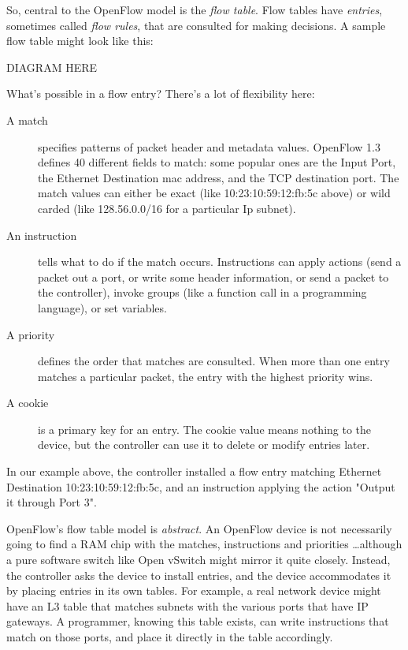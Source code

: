 So, central to the OpenFlow model is the \textit{flow table}.  
Flow tables have \textit{entries}, sometimes called \textit{flow rules}, that are consulted for making decisions.
A sample flow table might look like this:

DIAGRAM HERE

What's possible in a flow entry?
There's a lot of flexibility here:

\begin{description}
\item[A match] specifies patterns of packet header and metadata values.
OpenFlow 1.3 defines 40 different fields to match: some popular ones are the Input Port, 
the Ethernet Destination mac address, and the TCP destination port.
The match values can either be exact (like 10:23:10:59:12:fb:5c above) or wild carded (like 128.56.0.0/16 for a
particular Ip subnet).
\item[An instruction] tells what to do if the match occurs.  
Instructions can apply actions (send a packet out a port, or write some header information, 
or send a packet to the controller), 
invoke groups (like a function call in a programming language), or set variables.
\item[A priority] defines the order that matches are consulted.  
When more than one entry matches a particular packet, the entry with the highest priority wins.
\item[A cookie] is a primary key for an entry.
The cookie value means nothing to the device, but the controller can use it to delete or modify entries later.
\end{description}

In our example above, the controller installed a flow entry matching Ethernet Destination 10:23:10:59:12:fb:5c, 
and an instruction applying the action "Output it through Port 3".

OpenFlow's flow table model is \textit{abstract}.
An OpenFlow device is not necessarily going to find a RAM chip with the matches, 
instructions and priorities \ldots although a pure software switch like Open vSwitch might mirror it quite closely.
Instead, the controller asks the device to install entries, and the device accommodates it by placing entries in its
own tables.
For example, a real network device might have an L3 table that matches subnets with the various ports that have
IP gateways.
A programmer, knowing this table exists, can write instructions that match on those ports, and place it directly in the
table accordingly.


